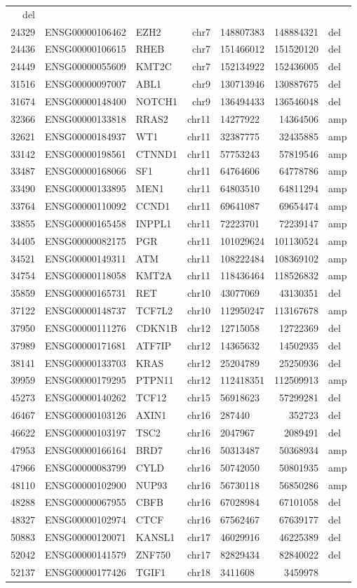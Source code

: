 \documentclass[]{article}
\begin{document}
\begin{longtable}[]{@{}rrlrlrl@{}}
del\tabularnewline
24329 & ENSG00000106462 & EZH2 & chr7 & 148807383 & 148884321 &
del\tabularnewline
24436 & ENSG00000106615 & RHEB & chr7 & 151466012 & 151520120 &
del\tabularnewline
24449 & ENSG00000055609 & KMT2C & chr7 & 152134922 & 152436005 &
del\tabularnewline
31516 & ENSG00000097007 & ABL1 & chr9 & 130713946 & 130887675 &
del\tabularnewline
31674 & ENSG00000148400 & NOTCH1 & chr9 & 136494433 & 136546048 &
del\tabularnewline
32366 & ENSG00000133818 & RRAS2 & chr11 & 14277922 & 14364506 &
amp\tabularnewline
32621 & ENSG00000184937 & WT1 & chr11 & 32387775 & 32435885 &
amp\tabularnewline
33142 & ENSG00000198561 & CTNND1 & chr11 & 57753243 & 57819546 &
amp\tabularnewline
33487 & ENSG00000168066 & SF1 & chr11 & 64764606 & 64778786 &
amp\tabularnewline
33490 & ENSG00000133895 & MEN1 & chr11 & 64803510 & 64811294 &
amp\tabularnewline
33764 & ENSG00000110092 & CCND1 & chr11 & 69641087 & 69654474 &
amp\tabularnewline
33855 & ENSG00000165458 & INPPL1 & chr11 & 72223701 & 72239147 &
amp\tabularnewline
34405 & ENSG00000082175 & PGR & chr11 & 101029624 & 101130524 &
amp\tabularnewline
34521 & ENSG00000149311 & ATM & chr11 & 108222484 & 108369102 &
amp\tabularnewline
34754 & ENSG00000118058 & KMT2A & chr11 & 118436464 & 118526832 &
amp\tabularnewline
35859 & ENSG00000165731 & RET & chr10 & 43077069 & 43130351 &
del\tabularnewline
37122 & ENSG00000148737 & TCF7L2 & chr10 & 112950247 & 113167678 &
amp\tabularnewline
37950 & ENSG00000111276 & CDKN1B & chr12 & 12715058 & 12722369 &
del\tabularnewline
37989 & ENSG00000171681 & ATF7IP & chr12 & 14365632 & 14502935 &
del\tabularnewline
38141 & ENSG00000133703 & KRAS & chr12 & 25204789 & 25250936 &
del\tabularnewline
39959 & ENSG00000179295 & PTPN11 & chr12 & 112418351 & 112509913 &
amp\tabularnewline
45273 & ENSG00000140262 & TCF12 & chr15 & 56918623 & 57299281 &
del\tabularnewline
46467 & ENSG00000103126 & AXIN1 & chr16 & 287440 & 352723 &
del\tabularnewline
46622 & ENSG00000103197 & TSC2 & chr16 & 2047967 & 2089491 &
del\tabularnewline
47953 & ENSG00000166164 & BRD7 & chr16 & 50313487 & 50368934 &
amp\tabularnewline
47966 & ENSG00000083799 & CYLD & chr16 & 50742050 & 50801935 &
amp\tabularnewline
48110 & ENSG00000102900 & NUP93 & chr16 & 56730118 & 56850286 &
amp\tabularnewline
48288 & ENSG00000067955 & CBFB & chr16 & 67028984 & 67101058 &
del\tabularnewline
48327 & ENSG00000102974 & CTCF & chr16 & 67562467 & 67639177 &
del\tabularnewline
50883 & ENSG00000120071 & KANSL1 & chr17 & 46029916 & 46225389 &
del\tabularnewline
52042 & ENSG00000141579 & ZNF750 & chr17 & 82829434 & 82840022 &
del\tabularnewline
52137 & ENSG00000177426 & TGIF1 & chr18 & 3411608 & 3459978 &

\end{longtable}
\end{document}
